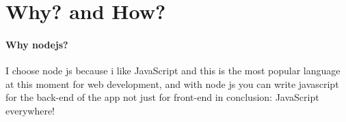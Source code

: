 \hfill \break
\section{Why? and How?}
\paragraph*{Why nodejs?}
I choose node js because i like JavaScript and this is the most popular language at this moment for web development, and with node js you can write javascript for the back-end of the app not just for front-end in conclusion: JavaScript everywhere!
